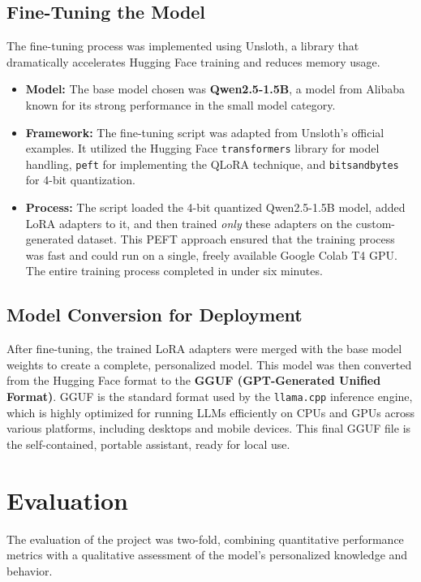 \documentclass[conference]{IEEEtran}
\begin{document}
\subsection{Fine-Tuning the Model}
The fine-tuning process was implemented using Unsloth, a library that dramatically accelerates Hugging Face training and reduces memory usage.
\begin{itemize}
    \item \textbf{Model:} The base model chosen was \textbf{Qwen2.5-1.5B}, a model from Alibaba known for its strong performance in the small model category.
    \item \textbf{Framework:} The fine-tuning script was adapted from Unsloth's official examples. It utilized the Hugging Face \texttt{transformers} library for model handling, \texttt{peft} for implementing the QLoRA technique, and \texttt{bitsandbytes} for 4-bit quantization.
    \item \textbf{Process:} The script loaded the 4-bit quantized Qwen2.5-1.5B model, added LoRA adapters to it, and then trained \textit{only} these adapters on the custom-generated dataset. This PEFT approach ensured that the training process was fast and could run on a single, freely available Google Colab T4 GPU. The entire training process completed in under six minutes.
\end{itemize}

\subsection{Model Conversion for Deployment}
After fine-tuning, the trained LoRA adapters were merged with the base model weights to create a complete, personalized model. This model was then converted from the Hugging Face format to the \textbf{GGUF (GPT-Generated Unified Format)}. GGUF is the standard format used by the \texttt{llama.cpp} inference engine, which is highly optimized for running LLMs efficiently on CPUs and GPUs across various platforms, including desktops and mobile devices. This final GGUF file is the self-contained, portable assistant, ready for local use.

\section{Evaluation}
The evaluation of the project was two-fold, combining quantitative performance metrics with a qualitative assessment of the model's personalized knowledge and behavior.
\end{document}
